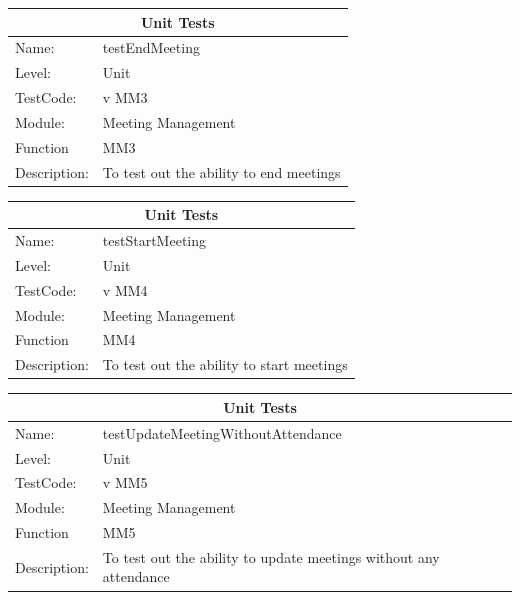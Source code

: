 \documentclass[12pt]{article}
\begin{document}
\begin{center}
\begin{tabular}{|l|p{12cm}|}
\hline
\multicolumn{2}{|c|}{\bf Unit Tests} \\
\hline
 Name: & testEndMeeting  \\
\hline
Level: & Unit \\
\hline
TestCode: & v MM3 \\
\hline
Module:& Meeting Management \\
\hline
Function & MM3 \\
\hline
Description: & To test out the ability to end meetings   \\
\hline

\end{tabular}
\end{center}

\begin{center}
\begin{tabular}{|l|p{12cm}|}
\hline
\multicolumn{2}{|c|}{\bf Unit Tests} \\
\hline
 Name: & testStartMeeting  \\
\hline
Level: & Unit \\
\hline
TestCode: & v MM4 \\
\hline
Module:& Meeting Management \\
\hline
Function & MM4 \\
\hline
Description: & To test out the ability to start meetings  \\
\hline

\end{tabular}
\end{center}

\begin{center}
\begin{tabular}{|l|p{12cm}|}
\hline
\multicolumn{2}{|c|}{\bf Unit Tests} \\
\hline
 Name: & testUpdateMeetingWithoutAttendance  \\
\hline
Level: & Unit \\
\hline
TestCode: & v MM5 \\
\hline
Module:& Meeting Management \\
\hline
Function & MM5 \\
\hline
Description: & To test out the ability to update meetings without any attendance  \\
\hline
\end{tabular}
\end{center}
\end{document}
